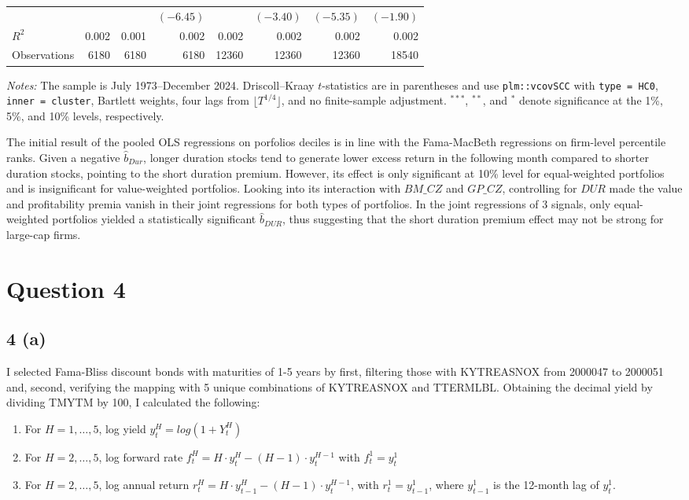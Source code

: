 \documentclass[11pt]{article}
\begin{document}
\begin{table}[H]
{\begin{tabular}{lrrrrrrr}
    &  &  & $(-6.45)$ &  & $(-3.40)$ & $(-5.35)$ & $(-1.90)$ \\
    $R^2$ & 0.002 & 0.001 & 0.002 & 0.002 & 0.002 & 0.002 & 0.002 \\
    Observations & 6180 & 6180 & 6180 & 12360 & 12360 & 12360 & 18540 \\
    \bottomrule
  \end{tabular}%
  }
  \begin{minipage}{\textwidth}
  \footnotesize \textit{Notes:} The sample is July 1973--December 2024. Driscoll--Kraay $t$-statistics are in parentheses and use \texttt{plm::vcovSCC} with \texttt{type = HC0}, \texttt{inner = cluster}, Bartlett weights, four lags from $\lfloor T^{1/4}\rfloor$, and no finite-sample adjustment. $^{***}$, $^{**}$, and $^{*}$ denote significance at the 1\%, 5\%, and 10\% levels, respectively.
  \end{minipage}
\end{table}

The initial result of the pooled OLS regressions on porfolios deciles is in line with the Fama-MacBeth regressions on firm-level percentile ranks. Given a negative $\hat{b}_{Dur}$, longer duration stocks tend to generate lower excess return in the following month compared to shorter duration stocks, pointing to the short duration premium. However, its effect is only significant at 10\% level for equal-weighted portfolios and is insignificant for value-weighted portfolios. Looking into its interaction with $BM\_CZ$ and $GP\_CZ$, controlling for $DUR$ made the value and profitability premia vanish in their joint regressions for both types of portfolios. In the joint regressions of 3 signals, only equal-weighted portfolios yielded a statistically significant $\hat{b}_{DUR}$, thus suggesting that the short duration premium effect may not be strong for large-cap firms. 


\section*{Question 4}
\subsection*{4 (a)} 
I selected Fama-Bliss discount bonds with maturities of 1-5 years by first, filtering those with KYTREASNOX from 2000047 to 2000051 and, second, verifying the mapping with 5 unique combinations of KYTREASNOX and TTERMLBL. Obtaining the decimal yield by dividing TMYTM by 100, I calculated the following: 
\begin{enumerate}
    \item For $H = 1,\ldots,5$, log yield $y_t^{H} = log(1+Y_t^{H})$
    \item For $H = 2,\ldots,5$, log forward rate $f_t^{H} = H \cdot y_t^{H} - (H-1) \cdot y_t^{H-1}$ with $f_t^{1} = y_t^{1}$
    \item For $H = 2,\ldots,5$, log annual return $r_t^{H} = H \cdot y_{t-1}^{H} - (H-1) \cdot y_t^{H-1}$, with $r_t^{1} = y_{t-1}^{1}$, where $y_{t-1}^{1}$ is the 12-month lag of $y_t^{1}$.
\end{enumerate}
\end{document}
